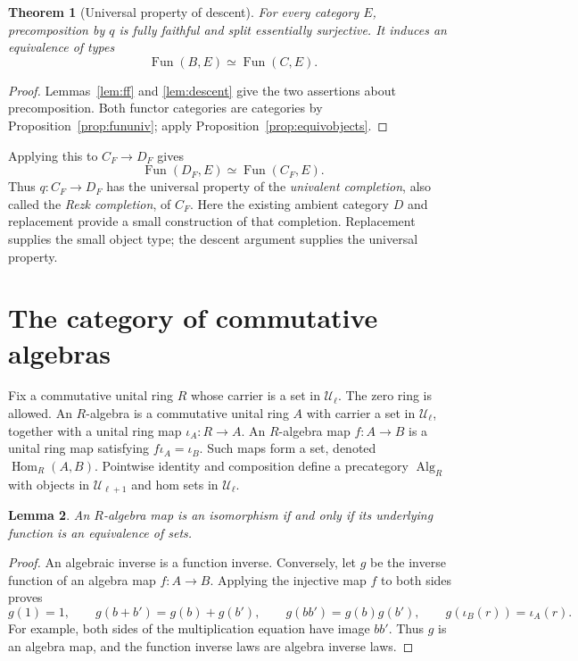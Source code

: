 \documentclass[11pt]{amsart}
\newtheorem{theorem}{Theorem}[section]
\newtheorem{lemma}[theorem]{Lemma}
\theoremstyle{definition}
\theoremstyle{remark}
\newcommand{\UU}{\mathcal U}
\newcommand{\Hom}{\operatorname{Hom}}
\newcommand{\Fun}{\operatorname{Fun}}
\newcommand{\Alg}{\operatorname{Alg}}
\begin{document}
\begin{theorem}[Universal property of descent]\label{thm:descent}
For every category $E$, precomposition by $q$ is fully faithful and split
essentially surjective. It induces an equivalence of types
\[
 \Fun(B,E)\simeq\Fun(C,E).
\]
\end{theorem}
\begin{proof}
Lemmas~\ref{lem:ff} and \ref{lem:descent} give the two assertions about
precomposition. Both functor categories are categories by
Proposition~\ref{prop:fununiv}; apply Proposition~\ref{prop:equivobjects}.
\end{proof}

Applying this to $C_F\to D_F$ gives
\begin{equation}\label{eq:completion}
 \Fun(D_F,E)\simeq\Fun(C_F,E).
\end{equation}
Thus $q:C_F\to D_F$ has the universal property of the \emph{univalent
completion}, also called the \emph{Rezk completion}, of $C_F$.
Here the existing ambient category $D$ and replacement provide a small
construction of that completion. Replacement supplies the small object
type; the descent argument supplies the universal property.

\section{The category of commutative algebras}

Fix a commutative unital ring $R$ whose carrier is a set in $\UU_\ell$.
The zero ring is allowed. An $R$-algebra is a commutative unital ring $A$
with carrier a set in $\UU_\ell$, together with a unital ring map
$\iota_A:R\to A$. An $R$-algebra map $f:A\to B$ is a unital ring map
satisfying $f\iota_A=\iota_B$. Such maps form a set, denoted
$\Hom_R(A,B)$. Pointwise identity and composition define a precategory
$\Alg_R$ with objects in $\UU_{\ell+1}$ and hom sets in $\UU_\ell$.

\begin{lemma}\label{lem:algiso}
An $R$-algebra map is an isomorphism if and only if its underlying
function is an equivalence of sets.
\end{lemma}
\begin{proof}
An algebraic inverse is a function inverse. Conversely, let $g$ be the
inverse function of an algebra map $f:A\to B$. Applying the injective
map $f$ to both sides proves
\[
 g(1)=1,\qquad g(b+b')=g(b)+g(b'),\qquad
 g(bb')=g(b)g(b'),\qquad g(\iota_B(r))=\iota_A(r).
\]
For example, both sides of the multiplication equation have image $bb'$.
Thus $g$ is an algebra map, and the function inverse laws are algebra
inverse laws.
\end{proof}
\end{document}
